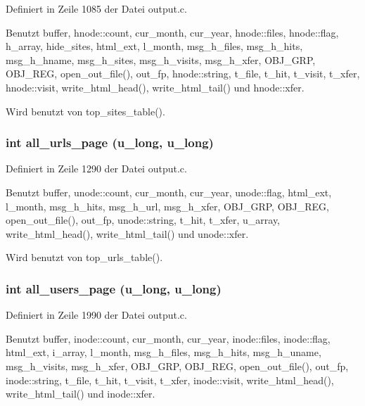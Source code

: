 Definiert in Zeile 1085 der Datei output.c.

Benutzt buffer, hnode::count, cur\_\-month, cur\_\-year, hnode::files, hnode::flag, h\_\-array, hide\_\-sites, html\_\-ext, l\_\-month, msg\_\-h\_\-files, msg\_\-h\_\-hits, msg\_\-h\_\-hname, msg\_\-h\_\-sites, msg\_\-h\_\-visits, msg\_\-h\_\-xfer, OBJ\_\-GRP, OBJ\_\-REG, open\_\-out\_\-file(), out\_\-fp, hnode::string, t\_\-file, t\_\-hit, t\_\-visit, t\_\-xfer, hnode::visit, write\_\-html\_\-head(), write\_\-html\_\-tail() und hnode::xfer.

Wird benutzt von top\_\-sites\_\-table().
\subsubsection{\setlength{\rightskip}{0pt plus 5cm}int all\_\-urls\_\-page (u\_\-long, u\_\-long)}\label{output_8c_510367124c184f22aac1331c1412c7d5}




Definiert in Zeile 1290 der Datei output.c.

Benutzt buffer, unode::count, cur\_\-month, cur\_\-year, unode::flag, html\_\-ext, l\_\-month, msg\_\-h\_\-hits, msg\_\-h\_\-url, msg\_\-h\_\-xfer, OBJ\_\-GRP, OBJ\_\-REG, open\_\-out\_\-file(), out\_\-fp, unode::string, t\_\-hit, t\_\-xfer, u\_\-array, write\_\-html\_\-head(), write\_\-html\_\-tail() und unode::xfer.

Wird benutzt von top\_\-urls\_\-table().
\subsubsection{\setlength{\rightskip}{0pt plus 5cm}int all\_\-users\_\-page (u\_\-long, u\_\-long)}\label{output_8c_b1313f0c59efbacd626ea5fb185f126e}




Definiert in Zeile 1990 der Datei output.c.

Benutzt buffer, inode::count, cur\_\-month, cur\_\-year, inode::files, inode::flag, html\_\-ext, i\_\-array, l\_\-month, msg\_\-h\_\-files, msg\_\-h\_\-hits, msg\_\-h\_\-uname, msg\_\-h\_\-visits, msg\_\-h\_\-xfer, OBJ\_\-GRP, OBJ\_\-REG, open\_\-out\_\-file(), out\_\-fp, inode::string, t\_\-file, t\_\-hit, t\_\-visit, t\_\-xfer, inode::visit, write\_\-html\_\-head(), write\_\-html\_\-tail() und inode::xfer.

